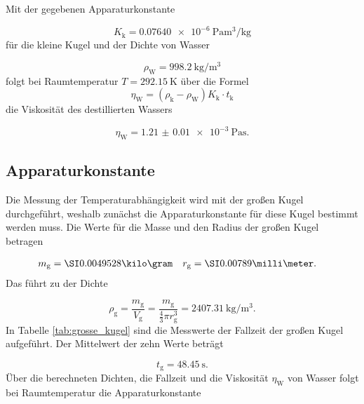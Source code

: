 \noindent Mit der gegebenen Apparaturkonstante

\begin{equation}
  K_\text{k} = \SI{0.07640e-6}{\pascal\cubic\meter\per\kilo\gram}
\end{equation}
für die kleine Kugel und der Dichte von Wasser \cite{TfCuP}

\begin{equation}
  \rho_\text{W} = \SI{998.2}{\kilo\gram\per\cubic\meter}
\end{equation}
folgt bei Raumtemperatur $T=\SI{292,15}{\kelvin}$ über die Formel
\begin{equation}
  \eta_\text{W} = (\rho_\text{k}-\rho_\text{W})K_\text{k} \cdot t_\text{k}
  \label{eqn:Viskositaet}
\end{equation}
die Viskosität des destillierten Wassers

\begin{equation}
  \eta_\text{W} = \SI{1.21(1)e-3}{\pascal\second}.
  \label{eqn:Viskosi}
\end{equation}


\subsection{Apparaturkonstante}

Die Messung der Temperaturabhängigkeit wird mit der großen Kugel durchgeführt,
weshalb zunächst die Apparaturkonstante für diese Kugel bestimmt werden muss.
Die Werte für die Masse und den Radius der großen Kugel betragen

\begin{align}
  m_\text{g} & = \grosseKugelMasse & r_\text{g} & =\grosseKugelRadius.
\end{align}
Das führt zu der Dichte

\begin{equation}
  \rho_\text{g} = \frac{m_\text{g}}{V_\text{g}} = \frac{m_\text{g}}
  {\frac{4}{3}\pi r_\text{g}^3} = \SI{2407.31}{\kilo\gram\per\cubic\meter}.
  \label{eqn:rhog}
\end{equation}
In Tabelle \ref{tab:grosse_kugel} sind die Messwerte der Fallzeit der großen
Kugel aufgeführt. Der Mittelwert der zehn Werte beträgt

\begin{equation}
  t_\text{g} = \SI{48.45}{\second}.
\end{equation}
Über die berechneten Dichten, die Fallzeit und die Viskosität $\eta_\text{W}$
von Wasser folgt bei Raumtemperatur die Apparaturkonstante

